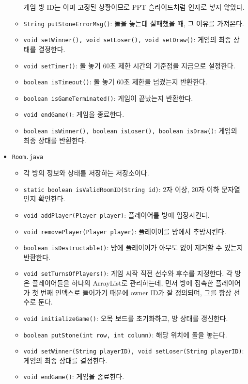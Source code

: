 \documentclass[a4paper, 10pt]{article}
\begin{document}
\begin{itemize}
\begin{itemize}
    게임 방 ID는 이미 고정된 상황이므로 PPT 슬라이드처럼 인자로 넣지 않았다.
    \item \texttt{String putStoneErrorMsg()}: 돌을 놓는데 실패했을 때, 그 이유를 가져온다.
    \item \texttt{void setWinner(), void setLoser(), void setDraw()}: 게임의 최종 상태를 결정한다.
    \item \texttt{void setTimer()}: 돌 놓기 60초 제한 시간의 기준점을 지금으로 설정한다.
    \item \texttt{boolean isTimeout()}: 돌 놓기 60초 제한을 넘겼는지 반환한다.
    \item \texttt{boolean isGameTerminated()}: 게임이 끝났는지 반환한다.
    \item \texttt{void endGame()}: 게임을 종료한다.
    \item \texttt{boolean isWinner(), boolean isLoser(), boolean isDraw()}: 게임의 최종 상태를 반환한다.
  \end{itemize}
  \item \texttt{Room.java}
  \begin{itemize}
    \item[] 각 방의 정보와 상태를 저장하는 저장소이다.
    \item \texttt{static boolean isValidRoomID(String id)}: 2자 이상, 20자 이하 문자열인지 확인한다.
    \item \texttt{void addPlayer(Player player)}: 플레이어를 방에 입장시킨다.
    \item \texttt{void removePlayer(Player player)}: 플레이어를 방에서 추방시킨다.
    \item \texttt{boolean isDestructable()}: 방에 플레이어가 아무도 없어 제거할 수 있는지 반환한다.
    \item \texttt{void setTurnsOfPlayers()}: 게임 시작 직전 선수와 후수를 지정한다. 각 방은 플레이어들을
    하나의 ArrayList로 관리하는데, 먼저 방에 접속한 플레이어가 첫 번째 인덱스로 들어가기 때문에 {\color{red} owner ID}가
    잘 정의되며, 그를 항상 선수로 둔다.
    \item \texttt{void initializeGame()}: 오목 보드를 초기화하고, 방 상태를 갱신한다.
    \item \texttt{boolean putStone(int row, int column)}: 해당 위치에 돌을 놓는다.
    \item \texttt{void setWinner(String playerID), void setLoser(String playerID)}: 게임의 최종 상태를 결정한다.
    \item \texttt{void endGame()}: 게임을 종료한다.
  \end{itemize}
\end{itemize}
\end{document}
